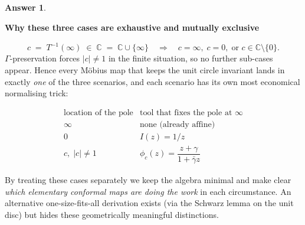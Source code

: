 \documentclass[12pt]{article}
\theoremstyle{definition} %
\newtheorem{answer}{Answer}
\theoremstyle{plain} %
\begin{document}
\begin{answer}
\begin{enumerate}
      \end{enumerate}
      
      \bigskip
      \textbf{Why these three cases are exhaustive and mutually exclusive}
      
      \vspace{-2mm}
      \[
         c\;=\;T^{-1}(\infty)\;\in\;\widehat{\mathbb{{C}}}
         \;=\;\mathbb{{C}}\cup\{\infty\}
         \quad\Longrightarrow\quad
         c=\infty,\;c=0,\;\text{or }c\in\mathbb{{C}}\setminus\{0\}.
      \]
      \(\Gamma\)-preservation forces \(|c|\neq1\) in the finite situation, so
      no further sub-cases appear.  Hence every Möbius map that keeps the unit
      circle invariant lands in exactly \emph{one} of the three scenarios,
      and each scenario has its own most economical normalising trick:
      
      \[
         \begin{array}{c|c}
           \text{location of the pole} & \text{tool that fixes the pole at }\infty
           \\\hline
             \infty & \text{none (already affine)} \\[4pt]
             0 & I(z)=1/z \\[4pt]
             c,\;|c|\neq1 & \phi_{c}(z)=\dfrac{z+\gamma}{1+\bar\gamma z}
         \end{array}
      \]
      
      By treating these cases separately we keep the algebra
      minimal and make clear \emph{which elementary conformal maps are doing
      the work} in each circumstance.  An alternative one-size-fits-all
      derivation exists (via the Schwarz lemma on the unit disc) but hides
      these geometrically meaningful distinctions.
      \end{answer}
\end{document}
